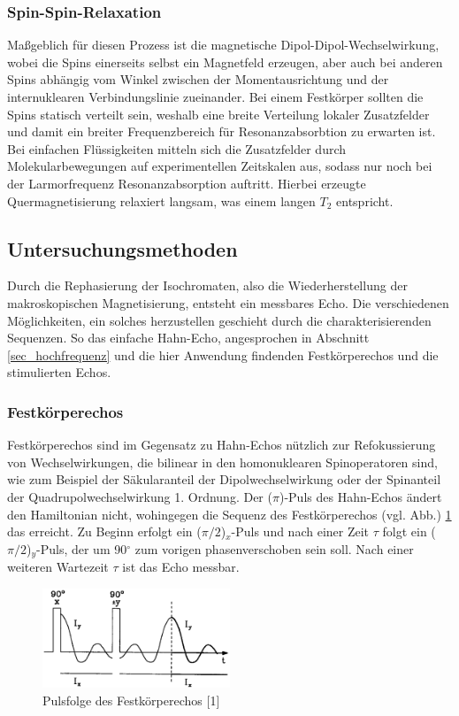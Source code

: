 \subsubsection{Spin-Spin-Relaxation}
Maßgeblich für diesen Prozess ist die magnetische Dipol-Dipol-Wechselwirkung, wobei die Spins einerseits selbst ein Magnetfeld erzeugen, aber auch bei anderen
Spins abhängig vom Winkel zwischen der Momentausrichtung und der internuklearen Verbindungslinie zueinander. Bei einem Festkörper sollten die Spins statisch 
verteilt sein, weshalb eine breite Verteilung lokaler Zusatzfelder und damit ein breiter Frequenzbereich für Resonanzabsorbtion zu erwarten ist. Bei
einfachen Flüssigkeiten mitteln sich die Zusatzfelder durch Molekularbewegungen auf experimentellen Zeitskalen aus, sodass nur noch bei der Larmorfrequenz
Resonanzabsorption auftritt. Hierbei erzeugte Quermagnetisierung relaxiert langsam, was einem langen $T_2$ entspricht.

\subsection{Untersuchungsmethoden}
Durch die Rephasierung der Isochromaten, also die Wiederherstellung der makroskopischen Magnetisierung, entsteht ein messbares Echo. Die verschiedenen 
Möglichkeiten, ein solches herzustellen geschieht durch die charakterisierenden Sequenzen. So das einfache Hahn-Echo, angesprochen in Abschnitt 
\ref{sec_hochfrequenz} und die hier Anwendung findenden Festkörperechos und die stimulierten Echos.
\subsubsection{Festkörperechos}
Festkörperechos sind im Gegensatz zu Hahn-Echos nützlich zur Refokussierung von Wechselwirkungen, die bilinear in den homonuklearen Spinoperatoren sind, wie
zum Beispiel der Säkularanteil der Dipolwechselwirkung oder der Spinanteil der Quadrupolwechselwirkung 1. Ordnung. Der ($\pi$)-Puls des Hahn-Echos ändert den
Hamiltonian nicht, wohingegen die Sequenz des Festkörperechos (vgl. Abb.) \ref{pic_festEchoFolge} das erreicht. Zu Beginn erfolgt ein ($\pi/2$)$_x$-Puls und
nach
einer Zeit $\tau$ folgt ein ($\pi/2$)$_y$-Puls, der um 90$^\circ$ zum vorigen phasenverschoben sein soll. Nach einer weiteren Wartezeit $\tau$ ist das
Echo messbar. 
\begin{figure}[htbp]
 \includegraphics[width=0.5\textwidth]{../pics/festEchoFolge.jpg}
 \caption{Pulsfolge des Festkörperechos [1]}
 \label{pic_festEchoFolge}
\end{figure}
\noindent


